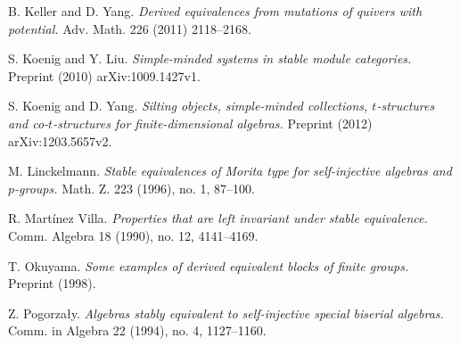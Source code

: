 \documentclass{amsart}
\begin{document}
\begin{thebibliography}{99}






 B. Keller and D. Yang.  \emph{Derived equivalences from mutations of quivers with potential.}  Adv. Math. 226 (2011) 2118--2168.

 S. Koenig and Y. Liu.  \emph{Simple-minded systems in stable module categories.}  Preprint (2010) arXiv:1009.1427v1.

 S. Koenig and D. Yang.  \emph{Silting objects, simple-minded collections, $t$-structures and co-$t$-structures for finite-dimensional algebras.}  Preprint (2012) arXiv:1203.5657v2.

 M. Linckelmann.  \emph{Stable equivalences of Morita type for self-injective algebras and $p$-groups.}  Math. Z. 223 (1996), no. 1, 87--100. 


 R. Mart\'{i}nez Villa.  \emph{Properties that are left invariant under stable equivalence.}  Comm. Algebra 18 (1990), no. 12, 4141--4169.



 T. Okuyama.  \emph{Some examples of derived equivalent blocks of finite groups.}  Preprint (1998).

 Z. Pogorza\l y.   \emph{Algebras stably equivalent to self-injective special biserial algebras.}   Comm. in Algebra 22 (1994), no. 4, 1127--1160.


\end{thebibliography}
\end{document}
